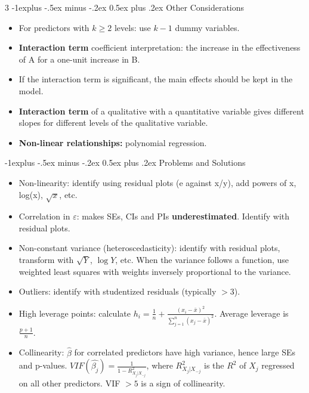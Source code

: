 \documentclass[10pt, landscape]{article}
\makeatletter
\renewcommand{\subsection}{\@startsection{subsection}{2}{0mm}%
  {-1explus -.5ex minus -.2ex}%
  {0.5ex plus .2ex}%
{\normalfont\normalsize\bfseries}}
\newcommand{\eps}{\varepsilon}
\makeatother
\begin{document}
\begin{multicols*}{3}
    \subsection{Other Considerations}
    \begin{itemize}
      \item For predictors with $k\ge2$ levels: use $k-1$ dummy variables.
      \item \textbf{Interaction term} coefficient interpretation: the increase in the effectiveness of A for a one-unit increase in B.
      \item If the interaction term is significant, the main effects should be kept in the model.
      \item \textbf{Interaction term} of a qualitative with a quantitative variable gives different slopes for different levels of the qualitative variable.
      \item \textbf{Non-linear relationships:} polynomial regression.
    \end{itemize}

    \subsection{Problems and Solutions}
    \begin{itemize}
      \item Non-linearity: identify using residual plots (e against x/y), add powers of x, log(x), $\sqrt{x}$, etc.
      \item Correlation in $\eps$: makes SEs, CIs and PIs \textbf{underestimated}. Identify with residual plots.
      \item Non-constant variance (heteroscedasticity): identify with residual plots, transform with $\sqrt{Y}$, $\log{Y}$, etc. When the variance follows a function, use weighted least squares with weights inversely proportional to the variance.
      \item Outliers: identify with studentized residuals (typically $>3$).
      \item High leverage points: calculate $h_i = \frac{1}{n} + \frac{(x_i - \bar{x})^2}{\sum_{j=1}^n (x_j - \bar{x})^2}$. Average leverage is $\frac{p+1}{n}$.
      \item Collinearity: $\hat{\beta}$ for correlated predictors have high variance, hence large SEs and p-values. $VIF(\hat{\beta_j}) = \frac{1}{1 - R^2_{X_j|X_{-j}}}$, where $R^2_{X_j|X_{-j}}$ is the $R^2$ of $X_j$ regressed on all other predictors. VIF $> 5$ is a sign of collinearity.
    \end{itemize}


\end{multicols*}
\end{document}
